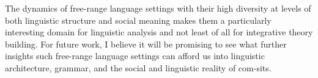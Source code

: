 The dynamics of free-range language settings with their high diversity at levels of both linguistic structure and social meaning makes them a particularly interesting domain for linguistic analysis and not least of all for integrative theory building. For future work, I believe it will be promising to see what further insights such free-range language settings can afford us into linguistic architecture, grammar, and the social and linguistic reality of com-sits.
